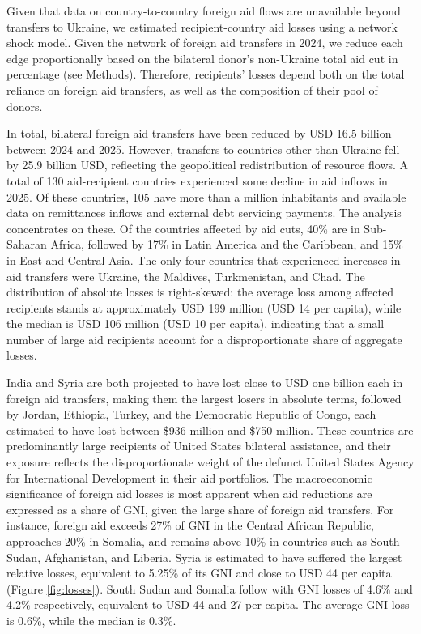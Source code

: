 \documentclass[fleqn,10pt,twocolumn]{wlscirep}
\begin{document}
{Given that data on country-to-country foreign aid flows are unavailable beyond transfers to Ukraine, we estimated recipient-country aid losses using a network shock model. Given the network of foreign aid transfers in 2024, we reduce each edge proportionally based on the bilateral donor's non-Ukraine total aid cut in percentage (see Methods). Therefore, recipients' losses depend both on the total reliance on foreign aid transfers, as well as the composition of their pool of donors. 

In total, bilateral foreign aid transfers have been reduced by USD 16.5 billion between 2024 and 2025. However, transfers to countries other than Ukraine fell by 25.9 billion USD, reflecting the geopolitical redistribution of resource flows. A total of 130 aid-recipient countries experienced some decline in aid inflows in 2025. Of these countries, 105 have more than a million inhabitants and available data on remittances inflows and external debt servicing payments. The analysis concentrates on these. Of the countries affected by aid cuts, 40\% are in Sub-Saharan Africa, followed by 17\% in Latin America and the Caribbean, and 15\% in East and Central Asia. The only four countries that experienced increases in aid transfers were Ukraine, the Maldives, Turkmenistan, and Chad. The distribution of absolute losses is right-skewed: the average loss among affected recipients stands at approximately USD 199 million (USD 14 per capita), while the median is USD 106 million (USD 10 per capita), indicating that a small number of large aid recipients account for a disproportionate share of aggregate losses.

 India and Syria are both projected to have lost close to USD one billion each in foreign aid transfers, making them the largest losers in absolute terms, followed by Jordan, Ethiopia, Turkey, and the Democratic Republic of Congo, each estimated to have lost between \$936 million and \$750 million. These countries are predominantly large recipients of United States bilateral assistance, and their exposure reflects the disproportionate weight of the defunct United States Agency for International Development in their aid portfolios. The macroeconomic significance of foreign aid losses is most apparent when aid reductions are expressed as a share of GNI, given the large share of foreign aid transfers. For instance, foreign aid exceeds 27\% of GNI in the Central African Republic, approaches 20\% in Somalia, and remains above 10\% in countries such as South Sudan, Afghanistan, and Liberia. Syria is estimated to have suffered the largest relative losses, equivalent to 5.25\% of its GNI and close to USD 44 per capita (Figure \ref{fig:losses}). South Sudan and Somalia follow with GNI losses of 4.6\% and 4.2\% respectively, equivalent to USD 44 and 27 per capita. The average GNI loss is 0.6\%, while the median is 0.3\%.

}
\end{document}
